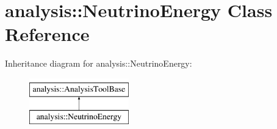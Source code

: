 \hypertarget{classanalysis_1_1NeutrinoEnergy}{}\section{analysis\+:\+:Neutrino\+Energy Class Reference}
\label{classanalysis_1_1NeutrinoEnergy}
Inheritance diagram for analysis\+:\+:Neutrino\+Energy\+:\begin{figure}[H]
\begin{center}
\leavevmode
\includegraphics[height=2.000000cm]{classanalysis_1_1NeutrinoEnergy}
\end{center}
\end{figure}
